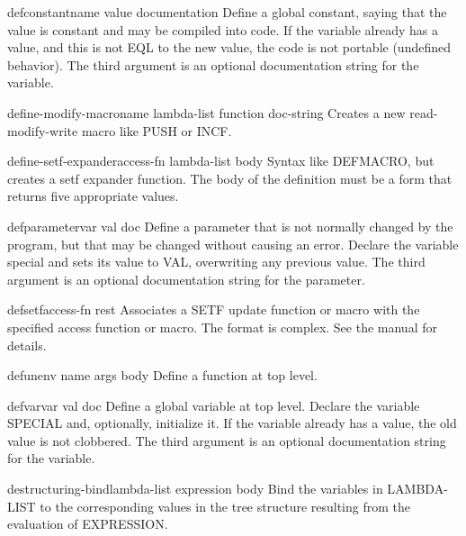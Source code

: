 \documentclass[10pt,english]{book}
\begin{document}
\begin{macro}{defconstant}{name value \op documentation}
  Define a global constant, saying that the value is constant and may be
  compiled into code. If the variable already has a value, and this is not
  EQL to the new value, the code is not portable (undefined behavior). The
  third argument is an optional documentation string for the variable.
\end{macro}

\begin{macro}{define-modify-macro}{name lambda-list function \op doc-string}
  Creates a new read-modify-write macro like PUSH or INCF.
\end{macro}

\begin{macro}{define-setf-expander}{access-fn lambda-list \body body}
  Syntax like DEFMACRO, but creates a setf expander function. The body
  of the definition must be a form that returns five appropriate values.
\end{macro}

\begin{macro}{defparameter}{var val \op doc}
  Define a parameter that is not normally changed by the program,
  but that may be changed without causing an error. Declare the
  variable special and sets its value to VAL, overwriting any
  previous value. The third argument is an optional documentation
  string for the parameter.
\end{macro}

\begin{macro}{defsetf}{access-fn \rest rest}
  Associates a SETF update function or macro with the specified access
  function or macro. The format is complex. See the manual for details.
\end{macro}

\begin{macro}{defun}{\env env name args \body body}
  Define a function at top level.
\end{macro}

\begin{macro}{defvar}{var \op val doc}
  Define a global variable at top level. Declare the variable
  SPECIAL and, optionally, initialize it. If the variable already has a
  value, the old value is not clobbered. The third argument is an optional
  documentation string for the variable.
\end{macro}

\begin{macro}{destructuring-bind}{lambda-list expression \body body}
  Bind the variables in LAMBDA-LIST to the corresponding values in the
tree structure resulting from the evaluation of EXPRESSION.
\end{macro}
\end{document}
